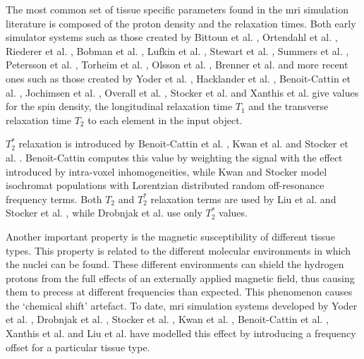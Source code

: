 \hfill

The most common set of tissue specific parameters 
found in the \ac{mri} simulation literature is composed of the proton density and the relaxation times.
Both early simulator systems such as those created by
Bittoun et al. \cite{Bittoun1984},
Ortendahl et al. \cite{Ortendahl1984},
Riederer et al. \cite{Riederer1984},
Bobman et al. \cite{Bobman1985},
Lufkin et al. \cite{Lufkin1986},
Stewart et al. \cite{Stewart1986},
Summers et al. \cite{Summers1986},
Petersson et al. \cite{Petersson1993},
Torheim et al. \cite{Torheim1994}, 
Olsson et al. \cite{Olsson1995},
Brenner et al. \cite{Brenner1997} and
more recent ones such as those created by
Yoder et al. \cite{Yoder2004},
Hacklander et al. \cite{Hacklander2005},
Benoit-Cattin et al. \cite{Benoit-Cattin2005},
Jochimsen et al. \cite{Jochimsen2004},
Overall et al. \cite{Overall2007},
Stocker et al. \cite{Stocker2010} and
Xanthis et al. \cite{Xanthis2014}
give values for the spin density, the longitudinal relaxation time $T_1$ and the transverse relaxation time $T_2$ to each element in the input object.

\hfill

$T_2^*$ relaxation is introduced by Benoit-Cattin et al. \cite{Benoit-Cattin2005},
Kwan et al. \cite{Kwan1997} 
and Stocker et al. \cite{Stocker2010}.
Benoit-Cattin computes this value by weighting the signal with the effect introduced by intra-voxel inhomogeneities,
while Kwan and Stocker model isochromat populations with Lorentzian distributed random off-resonance frequency terms.
Both $T_2$ and $T_2^*$ relaxation terms are used by Liu et al. \cite{Liu2014} and Stocker et al. \cite{Stocker2010}, while 
Drobnjak et al. \cite{Drobnjak2006} use only $T_2^*$ values.
 
\hfill

Another important property is the magnetic susceptibility of different tissue types.
This property is related to the different molecular environments in which the nuclei can be found.
These different environments can shield the hydrogen protons from the full effects of an externally applied magnetic field, thus causing them to precess at different frequencies than expected.
This phenomenon causes the `chemical shift' artefact.
To date, \ac{mri} simulation systems developed by
Yoder et al. \cite{Yoder2004}, 
Drobnjak et al. \cite{Drobnjak2006}, 
Stocker et al. \cite{Stocker2010}, 
Kwan et al. \cite{Kwan1999}, 
Benoit-Cattin et al. \cite{Benoit-Cattin2005}, 
Xanthis et al. \cite{Xanthis2014} and 
Liu et al. \cite{Liu2013} 
have modelled this effect by 
introducing a frequency offset for a particular tissue type.

